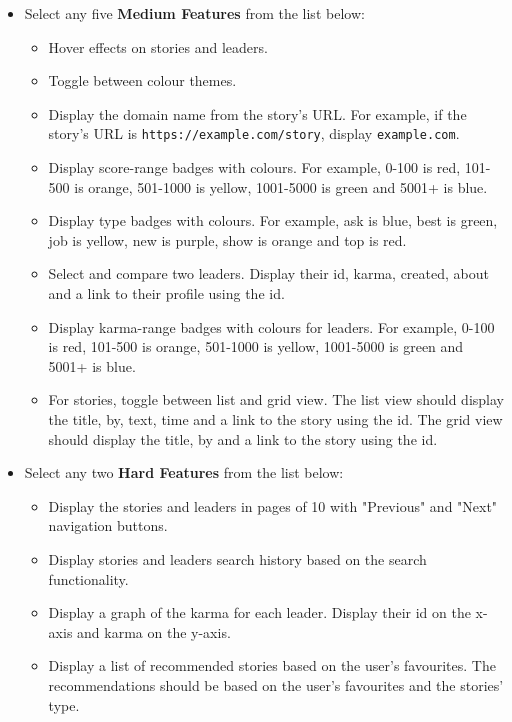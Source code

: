 \documentclass{article}
\begin{document}
\begin{itemize}
\begin{itemize}
			\item Select any five \textbf{Medium Features} from the list below:
			\begin{itemize}
				\item Hover effects on stories and leaders.
				\item Toggle between colour themes. 
				\item Display the domain name from the story's URL. For example, if the story's URL is \texttt{https://example.com/story}, display \texttt{example.com}.
				\item Display score-range badges with colours. For example, 0-100 is red, 101-500 is orange, 501-1000 is yellow, 1001-5000 is green and 5001+ is blue.
				\item Display type badges with colours. For example, ask is blue, best is green, job is yellow, new is purple, show is orange and top is red.
				\item Select and compare two leaders. Display their id, karma, created, about and a link to their profile using the id.
				\item Display karma-range badges with colours for leaders. For example, 0-100 is red, 101-500 is orange, 501-1000 is yellow, 1001-5000 is green and 5001+ is blue.
				\item For stories, toggle between list and grid view. The list view should display the title, by, text, time and a link to the story using the id. The grid view should display the title, by and a link to the story using the id.
			\end{itemize}	
			\item Select any two \textbf{Hard Features} from the list below:
			\begin{itemize}
				\item Display the stories and leaders in pages of 10 with "Previous" and "Next" navigation buttons.
				\item Display stories and leaders search history based on the search functionality.
				\item Display a graph of the karma for each leader. Display their id on the x-axis and karma on the y-axis.
				\item Display a list of recommended stories based on the user's favourites. The recommendations should be based on the user's favourites and the stories' type.
			  \end{itemize}	
		 \end{itemize}


\end{itemize}
\end{document}
